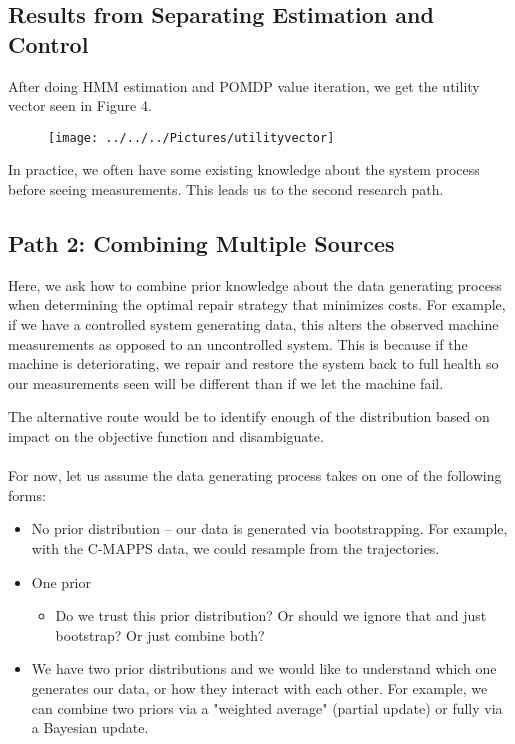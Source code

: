 \documentclass[english]{article}
\numberwithin{equation}{section}
\begin{document}
	\subsection*{Results from Separating Estimation and Control}
	After doing HMM estimation and POMDP value iteration, we get the utility vector seen in Figure 4.
	
		\begin{figure}
		\centering
		\texttt{[image: ../../../Pictures/utilityvector]}
		\caption[Utility vector]{}
		\label{fig:utilityvec}
	\end{figure}
	
	In practice, we often have some existing knowledge about the system process before seeing measurements. This leads us to the second research path.
	
	\subsection*{Path 2: Combining Multiple Sources}
	
	Here, we ask how to combine prior knowledge about the data generating process when determining the optimal repair strategy that minimizes costs. For example, if we have a controlled system generating data, this alters the observed machine measurements as opposed to an uncontrolled system. This is because if the machine is deteriorating, we repair and restore the system back to full health so our measurements seen will be different than if we let the machine fail.
	
	The alternative route would be to identify enough of the distribution based on impact on the objective function and disambiguate. 
	\\
	\\
	For now, let us assume the data generating process takes on one of the following forms:
	\begin{itemize}
		\item No prior distribution -- our data is generated via bootstrapping. For example, with the C-MAPPS data, we could resample from the trajectories.
		\item One prior
		\begin{itemize}
			\item Do we trust this prior distribution? Or should we ignore that and just bootstrap? Or just combine both?
		\end{itemize}
		\item We have two prior distributions and we would like to understand which one generates our data, or how they interact with each other. For example, we can combine two priors via a "weighted average" (partial update) or fully via a Bayesian update.
	\end{itemize}
	
\end{document}
